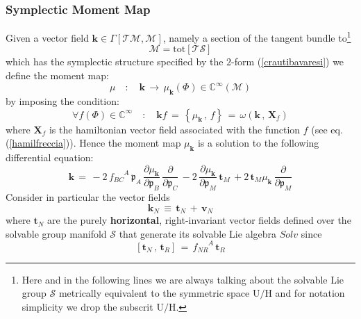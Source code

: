 \documentclass[10pt,a4paper]{article}
\begin{document}
\subsubsection{Symplectic Moment Map}
Given a vector field $\mathbf{k} \in \Gamma\left[\mathcal{TM},\mathcal{M}\right]$, namely a section of the tangent bundle to\footnote{Here and in the following lines we are always talking about the solvable Lie group $\mathcal{S}$ metrically equivalent to the symmetric space $\mathrm{U/H}$ and for notation simplicity we drop the subscrit $\mathrm{U/H}$.}
\begin{equation}\label{matotto}
  \mathcal{M} = \mathrm{tot}[\mathcal{TS}]
\end{equation}
which has the symplectic structure specified by the $2$-form  (\ref{crautibavaresi}) we define the moment map:
\begin{equation}\label{momentimappo}
  \mu \quad : \quad \mathbf{k} \, \longrightarrow \, \mu_\mathbf{k}\left(\Phi \right) \in \mathbb{C}^{\infty} \left(\mathcal{M}\right)
\end{equation}
by imposing the condition:
\begin{equation}\label{obbligohamil}
\forall f(\Phi)\in \mathbb{C}^{\infty} \quad : \quad
\mathbf{k} f\, = \, \left\{\mu_\mathbf{k}\, , \, f\right\} \, = \, \omega\left(\mathbf{k}\, , \, \mathbf{X}_f \right)
\end{equation}
where $\mathbf{X}_f$ is the hamiltonian vector field associated with the function $f$ (see eq.(\ref{hamilfreccia})). Hence the moment map $\mu_\mathbf{k}$ is a solution to the following differential equation:
\begin{equation}\label{diffeque}
  \mathbf{k} \, = \,- 2 \, f^{\phantom{BC}A}_{BC} \, \mathfrak{p}_A \, \frac{\partial \mu_\mathbf{k}}{\partial \mathfrak{p}_B} \, \frac{\partial }{\partial \mathfrak{p}_C}\,- 2 \, \frac{\partial \mu_\mathbf{k}}{\partial \mathfrak{p}_M} \, \mathbf{t}_M \, + 2 \, \mathbf{t}_M\mu_\mathbf{k} \, \frac{\partial }{\partial \mathfrak{p}_M}
\end{equation}
Consider in particular the vector fields
\begin{equation}\label{cartieradiriso}
  \mathbf{k}_N \, \equiv \, \mathbf{t}_N \, + \, \mathbf{v}_N
\end{equation}
where $\mathbf{t}_N$ are  the purely \textbf{horizontal}, right-invariant vector fields  defined over the solvable group manifold $\mathcal{S}$ that generate its solvable Lie algebra $Solv$ since
\begin{equation}\label{ticommi}
  \left[\mathbf{t}_N\, , \,\mathbf{t}_R  \right] \, = \,
  f^{\phantom{NR}A}_{NR} \, \mathbf{t}_R
\end{equation}
\end{document}
